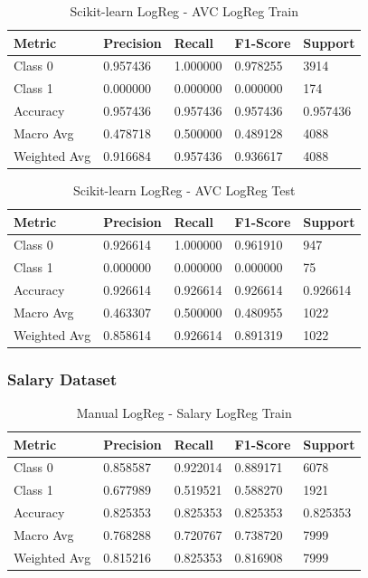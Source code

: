 \documentclass[a4paper,12pt]{article}
\begin{document}
    \begin{table}[h!]
    \centering
    \caption{Scikit-learn LogReg - AVC LogReg Train}
    \begin{tabularx}{\textwidth}{|l|X|X|X|X|}
    \hline
    \textbf{Metric} & \textbf{Precision} & \textbf{Recall} & \textbf{F1-Score} & \textbf{Support} \\
    \hline
    Class 0 & 0.957436 & 1.000000 & 0.978255 & 3914 \\
    Class 1 & 0.000000 & 0.000000 & 0.000000 & 174 \\
    Accuracy & 0.957436 & 0.957436 & 0.957436 & 0.957436 \\
    Macro Avg & 0.478718 & 0.500000 & 0.489128 & 4088 \\
    Weighted Avg & 0.916684 & 0.957436 & 0.936617 & 4088 \\
    \hline
    \end{tabularx}
    \end{table}
    
    \begin{table}[h!]
    \centering
    \caption{Scikit-learn LogReg - AVC LogReg Test}
    \begin{tabularx}{\textwidth}{|l|X|X|X|X|}
    \hline
    \textbf{Metric} & \textbf{Precision} & \textbf{Recall} & \textbf{F1-Score} & \textbf{Support} \\
    \hline
    Class 0 & 0.926614 & 1.000000 & 0.961910 & 947 \\
    Class 1 & 0.000000 & 0.000000 & 0.000000 & 75 \\
    Accuracy & 0.926614 & 0.926614 & 0.926614 & 0.926614 \\
    Macro Avg & 0.463307 & 0.500000 & 0.480955 & 1022 \\
    Weighted Avg & 0.858614 & 0.926614 & 0.891319 & 1022 \\
    \hline
    \end{tabularx}
    \end{table}
    
    \newpage
    \subsubsection{Salary Dataset}
    
    \begin{table}[h!]
    \centering
    \caption{Manual LogReg - Salary LogReg Train}
    \begin{tabularx}{\textwidth}{|l|X|X|X|X|}
    \hline
    \textbf{Metric} & \textbf{Precision} & \textbf{Recall} & \textbf{F1-Score} & \textbf{Support} \\
    \hline
    Class 0 & 0.858587 & 0.922014 & 0.889171 & 6078 \\
    Class 1 & 0.677989 & 0.519521 & 0.588270 & 1921 \\
    Accuracy & 0.825353 & 0.825353 & 0.825353 & 0.825353 \\
    Macro Avg & 0.768288 & 0.720767 & 0.738720 & 7999 \\
    Weighted Avg & 0.815216 & 0.825353 & 0.816908 & 7999 \\
    \hline
    \end{tabularx}
    \end{table}
    
\end{document}
